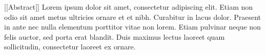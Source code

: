[[Abstract]] Lorem ipsum dolor sit amet, consectetur adipiscing elit. Etiam non odio sit amet metus ultricies ornare et et nibh. Curabitur in lacus dolor. Praesent in ante nec nulla elementum porttitor vitae non lorem. Etiam pulvinar neque non felis auctor, sed porta erat blandit. Duis maximus lectus laoreet quam sollicitudin, consectetur laoreet ex ornare. 